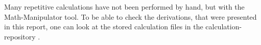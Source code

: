 Many repetitive calculations have not been performed by hand, but with the Math-Manipulator tool.
To be able to check the derivations, that were presented in this report, one can look at the stored calculation files in the calculation-repository \cite{selfMathManipulatorCalculations}.